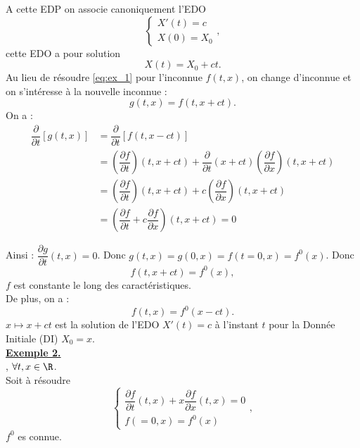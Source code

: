 \documentclass[12pt,a4paper]{article}
\newcommand\diff[2]{\dfrac{\partial #1}{\partial #2}}
\begin{document}
	A cette EDP on associe canoniquement l'EDO 
	\begin{equation}
		\begin{cases}
			X'(t) = c\\
			X(0) = X_0
		\end{cases},
	\end{equation}
	cette EDO a pour solution 
	\begin{equation}\label{eq:sol_1}
		X(t) = X_0 + ct.
	\end{equation}
	Au lieu de résoudre \eqref{eq:ex_1} pour l'inconnue $f(t,x)$, on change d'inconnue et on s'intéresse à la nouvelle inconnue :
	\[
	g(t,x) = f(t,x+ct).
	\]
	On a :
	\[\begin{aligned}
		\diff{}{t}\left[g(t,x)\right] & = \diff{}{t}\left[f(t,x-ct)\right]\\
		&= \left(\diff{f}{t}\right)(t,x+ct) + \diff{}{t}(x+ct)\left(\diff{f}{x}\right) (t,x+ct)\\
		&= \left(\diff{f}{t}\right)(t,x+ct) + c \left(\diff{f}{x}\right)(t,x+ct)\\
		&= \left(\diff{f}{t}+c\diff{f}{x}\right)(t,x+ct) = 0
	\end{aligned}\]
	
	Ainsi : $\diff gt (t,x) = 0$. Donc $g(t,x) = g(0,x) = f(t=0,x) = f^0(x)$. Donc 
	\begin{equation}
		f(t,x+ct) = f^0(x),
	\end{equation} 
	$f$ est constante le long des caractéristiques.\\
	De plus, on a :
	\begin{equation}
		f(t,x) = f^0(x-ct).
	\end{equation}
	$x \mapsto x+ct$ est la solution de l'EDO $X'(t) = c$ à l'instant $t$ pour la Donnée Initiale (DI) $X_0 = x$.\\
	
	\large{\textbf{\underline{Exemple 2.}}}\\
	
	, $\forall t,x \in \R$.\\
	Soit à résoudre 
	\begin{equation}
		\begin{cases}
			\diff ft(t,x) + x\diff fx(t,x) = 0\\
			f(=0,x) = f^0(x)
		\end{cases},
	\end{equation}
	$f^0$ es connue.\\
	
\end{document}
